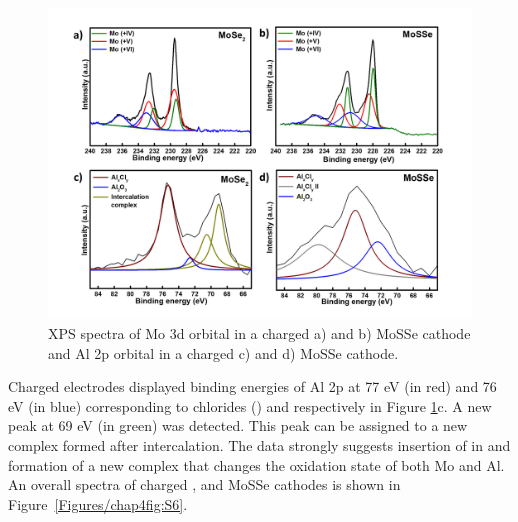 \begin{figure}[htb!]
\centering
\includegraphics[width=\textwidth]{Figures/chap4fig/XPS}
\caption{XPS spectra of Mo 3d orbital in a charged a)  and b) MoSSe cathode and Al 2p orbital in a charged c)  and d) MoSSe cathode.}
\label{Figures/chap4fig:XPS}
\end{figure}

Charged  electrodes displayed binding energies of Al 2p at 77 eV (in red) and 76 eV (in blue) corresponding to chlorides () and  respectively in Figure \ref{Figures/chap4fig:XPS}c. A new peak at 69 eV (in green) was detected. This peak can be assigned to a new complex formed after  intercalation. The data strongly suggests insertion of  in  and formation of a new complex that changes the oxidation state of both Mo and Al. An overall spectra of charged ,  and MoSSe cathodes is shown in Figure\ \ref{Figures/chap4fig:S6}.

